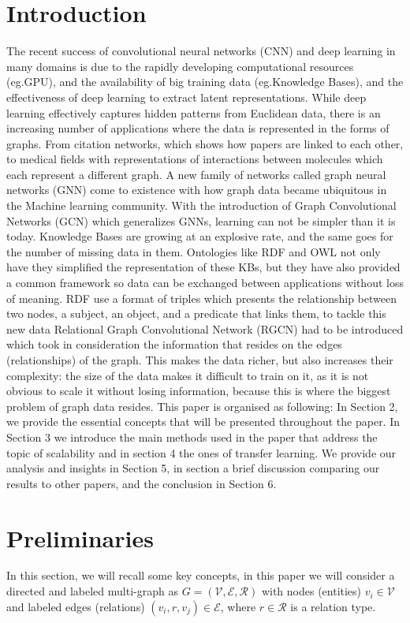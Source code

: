 \documentclass[11pt]{article}
\begin{document}
\section{Introduction} The recent success of convolutional  neural networks (CNN) and deep learning in many domains is due to the rapidly developing computational resources (eg.GPU), and the availability of big training data (eg.Knowledge Bases), and the effectiveness of deep learning to extract latent representations. While deep learning effectively captures hidden patterns from Euclidean data, there is an increasing number of applications where the data is represented in the forms of graphs. From citation networks, which shows how papers are linked to each other, to medical fields with representations of interactions between molecules which each represent a different graph. A new family of networks called graph neural networks (GNN) come to existence with how graph data became ubiquitous in the Machine learning community. With the introduction of Graph Convolutional Networks (GCN) \cite{kipf2016semi} which generalizes  GNNs, learning can not be simpler than it is today. Knowledge Bases are growing at an explosive rate, and the same goes for the number of missing data in them. Ontologies like RDF and OWL not only have they simplified the representation of these KBs, but they have also provided a common framework so data can be exchanged between applications without loss of meaning. RDF use a format of triples which presents the relationship between two nodes, a subject, an object, and a predicate that links them, to tackle this new data Relational Graph Convolutional Network (RGCN) \cite{schlichtkrull2017modeling} had to be introduced which took in consideration the information that resides on the edges (relationships) of the graph. This makes the data richer, but also increases their complexity: the size of the data makes it difficult to train on it, as it is not obvious to scale it without losing information, because this is where the biggest problem of graph data resides.
This paper is organised as following:
In Section 2, we provide the essential concepts that will be presented throughout the paper. In Section 3 we introduce the main methods used in the paper that address the topic of scalability and in section 4 the ones of transfer learning. We provide our analysis and insights in Section 5, in section a brief discussion comparing our results to other papers, and the conclusion in Section 6.


\section{Preliminaries}\label{ref:prelim}
In this section, we will recall some key concepts, in this paper we will consider a directed and labeled multi-graph as  $G = (\mathcal{V}, \mathcal{E}, \mathcal{R})$ with nodes (entities) $v_i \in \mathcal{V}$ and labeled edges (relations) $(v_i, r, v_j) \in \mathcal{E}$, where $r\in\mathcal{R}$ is a relation type.
\end{document}
